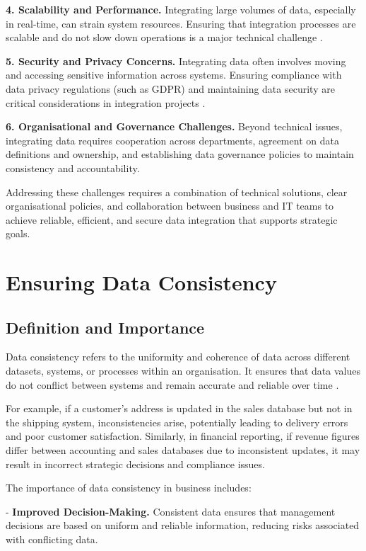 \textbf{4. Scalability and Performance.}  
Integrating large volumes of data, especially in real-time, can strain system resources. Ensuring that integration processes are scalable and do not slow down operations is a major technical challenge \cite{nash2019big}.

\textbf{5. Security and Privacy Concerns.}  
Integrating data often involves moving and accessing sensitive information across systems. Ensuring compliance with data privacy regulations (such as GDPR) and maintaining data security are critical considerations in integration projects \cite{zhang2019security}.

\textbf{6. Organisational and Governance Challenges.}  
Beyond technical issues, integrating data requires cooperation across departments, agreement on data definitions and ownership, and establishing data governance policies to maintain consistency and accountability.

Addressing these challenges requires a combination of technical solutions, clear organisational policies, and collaboration between business and IT teams to achieve reliable, efficient, and secure data integration that supports strategic goals.


\section{Ensuring Data Consistency}

\subsection{Definition and Importance}

Data consistency refers to the uniformity and coherence of data across different datasets, systems, or processes within an organisation. It ensures that data values do not conflict between systems and remain accurate and reliable over time \cite{chen2012data}.

For example, if a customer’s address is updated in the sales database but not in the shipping system, inconsistencies arise, potentially leading to delivery errors and poor customer satisfaction. Similarly, in financial reporting, if revenue figures differ between accounting and sales databases due to inconsistent updates, it may result in incorrect strategic decisions and compliance issues.

The importance of data consistency in business includes:

- \textbf{Improved Decision-Making.} Consistent data ensures that management decisions are based on uniform and reliable information, reducing risks associated with conflicting data.

